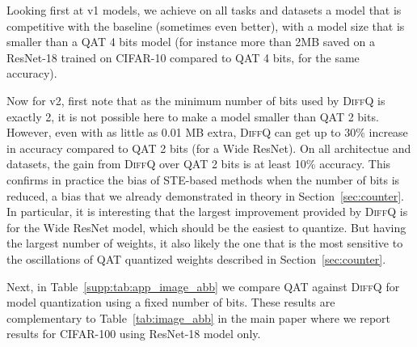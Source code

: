 \documentclass{article}
\newcommand{\diffq}{\textsc{DiffQ}\xspace}
\begin{document}
Looking first at v1 models, we achieve on all tasks and datasets
a model that is competitive with the baseline (sometimes even better),
with a model size that is smaller than a QAT 4 bits model (for instance more than 2MB saved on a ResNet-18 trained on CIFAR-10 compared to QAT 4 bits, for the same accuracy).

Now for v2, first note that as the minimum number of bits used by \diffq is exactly 2, it is not possible here to make a model smaller than QAT 2 bits. However, even with as little as 0.01 MB extra, \diffq can get up to 30\% increase in accuracy compared to QAT 2 bits (for a Wide ResNet). On all architectue and datasets,
the gain from \diffq over QAT 2 bits is at least 10\% accuracy.
This confirms in practice the bias of STE-based methods when the number
of bits is reduced, a bias that we already demonstrated in theory in Section~\ref{sec:counter}. In particular, it is interesting that the largest
improvement provided by \diffq is for the Wide ResNet model, which should be the easiest to quantize. But having the largest number of weights, it 
also likely the one that is the most sensitive to the oscillations of QAT quantized weights described in Section~\ref{sec:counter}.

Next, in Table~\ref{supp:tab:app_image_abb} we compare QAT against \diffq for model quantization using a fixed number of bits. These results are complementary to Table~\ref{tab:image_abb} in the main paper where we report results for CIFAR-100 using ResNet-18 model only. 
\end{document}
